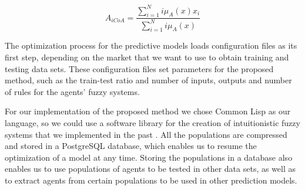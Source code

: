 \documentclass{ieeeaccess}
\begin{document}
\begin{equation}
  \label{equation:activation-score}
  A_{iCoA} = \dfrac{\sum_{i=1}^{N} i\mu_{A}(x) x_{i}}{\sum_{i=1}^{N}
    i\mu_{A}(x)}
\end{equation}

The optimization process for the predictive models loads configuration
files as its first step, depending on the market that we want to use
to obtain training and testing data sets. These configuration files
set parameters for the proposed method, such as the train-test ratio
and number of inputs, outputs and number of rules for the agents'
fuzzy systems.

For our implementation of the proposed method we chose Common Lisp as
our language, so we could use a software library for the creation of
intuitionistic fuzzy systems that we implemented in the past
\cite{Hernandez-Aguila2016} \cite{Hernandez-Aguila2017-2}. All the
populations are compressed and stored in a PostgreSQL database, which
enables us to resume the optimization of a model at any
time. Storing the populations in a database also enables us to use
populations of agents to be tested in other data sets, as well as to
extract agents from certain populations to be used in other prediction
models.


\end{document}
